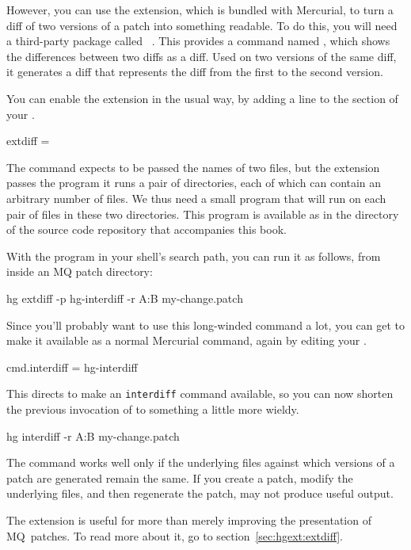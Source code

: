 However, you can use the  extension, which is bundled
with Mercurial, to turn a diff of two versions of a patch into
something readable.  To do this, you will need a third-party package
called ~\cite{web:patchutils}.  This provides a
command named , which shows the differences between
two diffs as a diff.  Used on two versions of the same diff, it
generates a diff that represents the diff from the first to the second
version.

You can enable the  extension in the usual way, by
adding a line to the  section of your \hgrc.
\begin{codesample2}
  [extensions]
  extdiff =
\end{codesample2}
The  command expects to be passed the names of two
files, but the  extension passes the program it runs a
pair of directories, each of which can contain an arbitrary number of
files.  We thus need a small program that will run 
on each pair of files in these two directories.  This program is
available as  in the 
directory of the source code repository that accompanies this book.

With the  program in your shell's search path,
you can run it as follows, from inside an MQ patch directory:
\begin{codesample2}
  hg extdiff -p hg-interdiff -r A:B my-change.patch
\end{codesample2}
Since you'll probably want to use this long-winded command a lot, you
can get  to make it available as a normal Mercurial
command, again by editing your \hgrc.
\begin{codesample2}
  [extdiff]
  cmd.interdiff = hg-interdiff
\end{codesample2}
This directs  to make an \texttt{interdiff} command
available, so you can now shorten the previous invocation of
 to something a little more wieldy.
\begin{codesample2}
  hg interdiff -r A:B my-change.patch
\end{codesample2}

\begin{note}
  The  command works well only if the underlying
  files against which versions of a patch are generated remain the
  same.  If you create a patch, modify the underlying files, and then
  regenerate the patch,  may not produce useful
  output.
\end{note}

The  extension is useful for more than merely improving
the presentation of MQ~patches.  To read more about it, go to
section~\ref{sec:hgext:extdiff}.


